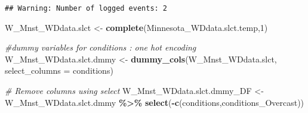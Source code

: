 \documentclass[
]{article}
\newenvironment{Shaded}{\begin{snugshade}}{\end{snugshade}}
\newcommand{\AttributeTok}[1]{\textcolor[rgb]{0.13,0.29,0.53}{#1}}
\newcommand{\CommentTok}[1]{\textcolor[rgb]{0.56,0.35,0.01}{\textit{#1}}}
\newcommand{\DecValTok}[1]{\textcolor[rgb]{0.00,0.00,0.81}{#1}}
\newcommand{\FunctionTok}[1]{\textcolor[rgb]{0.13,0.29,0.53}{\textbf{#1}}}
\newcommand{\NormalTok}[1]{#1}
\newcommand{\OtherTok}[1]{\textcolor[rgb]{0.56,0.35,0.01}{#1}}
\newcommand{\SpecialCharTok}[1]{\textcolor[rgb]{0.81,0.36,0.00}{\textbf{#1}}}
\newcommand{\StringTok}[1]{\textcolor[rgb]{0.31,0.60,0.02}{#1}}
\begin{document}
\begin{verbatim}
## Warning: Number of logged events: 2
\end{verbatim}

\begin{Shaded}
\begin{Highlighting}[]
\NormalTok{W\_Mnst\_WDdata.slct }\OtherTok{\textless{}{-}} \FunctionTok{complete}\NormalTok{(Minnesota\_WDdata.slct.temp,}\DecValTok{1}\NormalTok{)}

\CommentTok{\#dummy variables for conditions : one hot encoding}
\NormalTok{W\_Mnst\_WDdata.slct.dmmy }\OtherTok{\textless{}{-}} \FunctionTok{dummy\_cols}\NormalTok{(W\_Mnst\_WDdata.slct, }
                                         \AttributeTok{select\_columns =} \StringTok{\textquotesingle{}conditions\textquotesingle{}}\NormalTok{)}

\CommentTok{\# Remove columns using select}
\NormalTok{W\_Mnst\_WDdata.slct.dmmy\_DF }\OtherTok{\textless{}{-}}\NormalTok{ W\_Mnst\_WDdata.slct.dmmy }\SpecialCharTok{\%\textgreater{}\%} \FunctionTok{select}\NormalTok{(}\SpecialCharTok{{-}}\FunctionTok{c}\NormalTok{(conditions,conditions\_Overcast))}


\end{Highlighting}
\end{Shaded}
\end{document}
